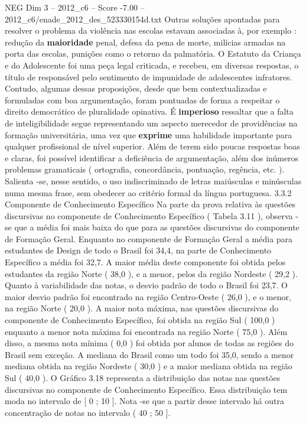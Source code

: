 \begin{textsample}{NEG Dim 3 – 2012\_c6 – Score -7.00 – 2012\_c6/enade\_2012\_des\_523330154d.txt}
Outras soluções apontadas para resolver o problema da violência nas escolas estavam associadas à, por exemplo : redução da \textbf{maioridade} penal, defesa da pena de morte, milícias armadas na porta das escolas, punições como o retorno da palmatória.
O Estatuto da Criança e do Adolescente foi uma peça legal criticada, e recebeu, em diversas respostas, o título de responsável pelo sentimento de impunidade de adolescentes infratores.
Contudo, algumas dessas proposições, desde que bem contextualizadas e formuladas com boa argumentação, foram pontuadas de forma a respeitar o direito democrático de pluralidade opinativa.
É \textbf{imperioso} ressaltar que a falta de inteligibilidade segue representando um aspecto merecedor de providências na formação universitária, uma vez que \textbf{exprime} uma habilidade importante para qualquer profissional de nível superior.
Além de terem sido poucas respostas boas e claras, foi possível identificar a deficiência de argumentação, além dos inúmeros problemas gramaticais ( ortografia, concordância, pontuação, regência, etc. ).
Salienta -se, nesse sentido, o uso indiscriminado de letras maiúsculas e minúsculas numa mesma frase, sem obedecer ao critério formal da língua portuguesa. 3.3.2 Componente de Conhecimento Específico Na parte da prova relativa às questões discursivas no componente de Conhecimento Específico ( Tabela 3.11 ), observa -se que a média foi mais baixa do que para as questões discursivas do componente de Formação Geral.
Enquanto no componente de Formação Geral a média para estudantes de Design de todo o Brasil foi 34,4, na parte de Conhecimento Específico a média foi 32,7.
A maior média deste componente foi obtida pelos estudantes da região Norte ( 38,0 ), e a menor, pelos da região Nordeste ( 29,2 ).
Quanto à variabilidade das notas, o desvio padrão de todo o Brasil foi 23,7.
O maior desvio padrão foi encontrado na região Centro-Oeste ( 26,0 ), e o menor, na região Norte ( 20,0 ).
A maior nota máxima, nas questões discursivas do componente de Conhecimento Específico, foi obtida na região Sul ( 100,0 ) enquanto a menor nota máxima foi encontrada na região Norte ( 75,0 ).
Além disso, a mesma nota mínima ( 0,0 ) foi obtida por alunos de todas as regiões do Brasil sem exceção.
A mediana do Brasil como um todo foi 35,0, sendo a menor mediana obtida na região Nordeste ( 30,0 ) e a maior mediana obtida na região Sul ( 40,0 ).
O Gráfico 3.18 representa a distribuição das notas nas questões discursivas no componente de Conhecimento Específico.
Essa distribuição tem moda no intervalo de [ 0 ; 10 ].
Nota -se que a partir desse intervalo há outra concentração de notas no intervalo ( 40 ; 50 ].

\end{textsample}
